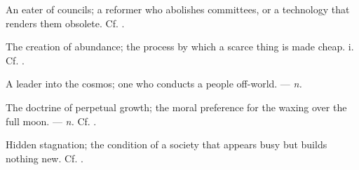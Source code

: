  An eater of councils; a reformer who abolishes committees, or a technology that renders them obsolete. Cf. .

 The creation of abundance; the process by which a scarce thing is made cheap.   i. Cf. .

 A leader into the cosmos; one who conducts a people off-world. ---  \textit{n.}

 The doctrine of perpetual growth; the moral preference for the waxing over the full moon. ---  \textit{n.} Cf. .

 Hidden stagnation; the condition of a society that appears busy but builds nothing new. Cf. .
